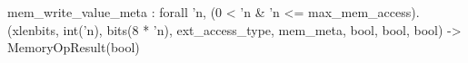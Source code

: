 mem_write_value_meta : forall 'n, (0 < 'n & 'n <= max_mem_access).
  (xlenbits, int('n), bits(8 * 'n), ext_access_type, mem_meta, bool, bool, bool) -> MemoryOpResult(bool)